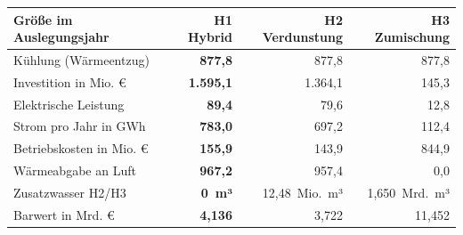 \begin{tabular}{@{}>{\hspace{0pt}\raggedright\arraybackslash}p{54mm}>{\bfseries}rrr@{}}
\toprule
Größe im Auslegungsjahr & H1 Hybrid & H2 Verdunstung & H3 Zumischung \\
\midrule
Kühlung (Wärmeentzug) & 877,8 & 877,8 & 877,8 \\
Investition in Mio. € & 1.595,1 & 1.364,1 & 145,3 \\
Elektrische Leistung & 89,4 & 79,6 & 12,8 \\
Strom pro Jahr in GWh & 783,0 & 697,2 & 112,4 \\
Betriebskosten in Mio. € & 155,9 & 143,9 & 844,9 \\
Wärmeabgabe an Luft & 967,2 & 957,4 & 0,0 \\
Zusatzwasser H2/H3 & 0~m³ & 12,48~Mio.~m³ & 1,650~Mrd.~m³ \\
Barwert in Mrd. € & 4,136 & 3,722 & 11,452 \\
\bottomrule
\end{tabular}

